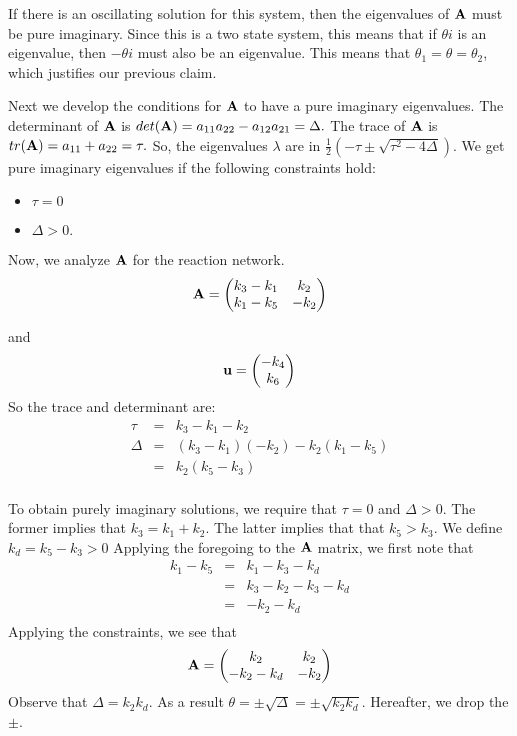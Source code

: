 \documentclass[11pt]{article}
\begin{document}
If there is an oscillating solution for this system, then the
eigenvalues of ${\bf A}$ must be pure imaginary. Since this is a two
state system, this means that if $\theta i$ is an eigenvalue, then
$-\theta i$ must also be an eigenvalue. This means that
$\theta_1 = \theta = \theta_2$, which justifies our previous claim.

Next we develop the conditions for ${\bf A}$ to have a pure imaginary
eigenvalues. The determinant of ${\bf A}$ is
$det({\bf A}) = a_{11} a_{22} - a_{12} a_{21} = \Delta.$
The trace of
${\bf A}$ is $tr({\bf A}) = a_{11} + a_{22} = \tau.$
So, the eigenvalues $\lambda$ are in
$\frac{1}{2} \left( - \tau \pm \sqrt{\tau^2 - 4 \Delta} \right). $
We get pure imaginary eigenvalues 
if the following constraints hold:
\begin{itemize}
\item $\tau = 0$ 
\item $\Delta > 0.$
\end{itemize}

Now, we analyze ${\bf A}$ for the reaction network.
\begin{equation*}
{\bf A} =
\begin{pmatrix}
k_3 - k_1 & k_2 \\
k_1 - k_5 & -k_2 \\
\end{pmatrix}
\end{equation*}

and 
\begin{equation*}
{\bf u} = 
\begin{pmatrix} - k_4 \\ k_6 \\ \end{pmatrix}
\end{equation*}
So the trace and determinant are:
\begin{eqnarray*}
\tau & = & k_3 -k_1 - k_2 \\
\Delta & = & (k_3 - k_1)(-k_2) - k_2 (k_1 - k_5) \\
& = & k_2 (k_5 - k_3) \\
\end{eqnarray*}

To obtain purely imaginary solutions, we require that $\tau =0$ and
$\Delta > 0$. The former implies that $k_3 = k_1 + k_2$. The latter
implies that that $k_5 > k_3$. We define $k_d = k_5 - k_3 > 0$
Applying the foregoing to the ${\bf A}$ matrix, we first note that
\begin{align*}
k_1 - k_5 & = & k_1 - k_3 -k_d \\
& = & k_3 - k_2 - k_3 - k_d \\
& = & -k_2 - k_d \\
\end{align*}
Applying the constraints,
we see that
\begin{equation*}
{\bf A} = 
\begin{pmatrix}
k_2 & k_2 \\
-k_2 - k_d & -k_2 \\
\end{pmatrix}
\end{equation*}
Observe that $\Delta = k_2 k_d$.
As a result
$\theta = \pm \sqrt{\Delta} = \pm \sqrt{k_2 k_d}$. Hereafter, we drop
the $\pm$.
\end{document}
